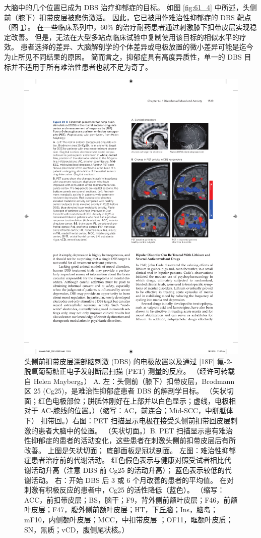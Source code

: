 大脑中的几个位置已成为 DBS 治疗抑郁症的目标。 如图 \ref{fig:61_4} 中所述，头侧前（膝下）扣带皮层被悲伤激活。 因此，它已被用作难治性抑郁症的 DBS 靶点（图 \ref{fig:61_8}）。 在一些临床系列中，60\% 的治疗耐药患者通过刺激膝下扣带皮层实现稳定改善。 但是，无法在大型多站点临床试验中复制使用该目标的相似水平的疗效。 患者选择的差异、大脑解剖学的个体差异或电极放置的微小差异可能是迄今为止所见不同结果的原因。 简而言之，抑郁症具有高度异质性，单一的 DBS 目标并不适用于所有难治性患者也就不足为奇了。

\begin{figure}[htbp]
	\centering
	\includegraphics[width=0.6\linewidth]{chap61/fig_61_8}
	\caption{头侧前扣带皮层深部脑刺激 (DBS) 的电极放置以及通过 [18F] 氟-2-脱氧葡萄糖正电子发射断层扫描 (PET) 测量的反应。 （经许可转载自 Helen Mayberg。） A. 左：头侧前（膝下）扣带皮层，Brodmann 区 25 (Cg25)，是难治性抑郁症患者 DBS 的解剖学目标。 （矢状切面；红色电极部位；胼胝体刚好在上部并以白色显示；虚线，电极相对于 AC-膝线的位置。）（缩写：AC，前连合；Mid-SCC，中胼胝体下） 扣带回。）右图：PET 扫描显示电极在接受头侧前扣带回皮层刺激的患者大脑中的位置。 （矢状切面。）B. PET 扫描显示患有难治性抑郁症的患者的活动变化，这些患者在刺激头侧前扣带皮层后有所改善。 上图是矢状切面； 底部面板是冠状剖面。 左图：难治性抑郁症患者治疗前的代谢活动。 红色假色表示与健康对照受试者相比代谢活动升高（注意 DBS 前 Cg25 的活动升高）； 蓝色表示较低的代谢活动。 右：开始 DBS 后 3 或 6 个月改善的患者的平均值。 在对刺激有积极反应的患者中，Cg25 的活性降低（蓝色）。 （缩写：ACC，前扣带皮层；BS，脑干；F9，背外侧前额叶皮层；F46，前额叶皮层；F47，腹外侧前额叶皮层；HT，下丘脑；Ins，脑岛；mF10，内侧额叶皮层；MCC，中扣带皮层 ；OF11，眶额叶皮质；SN，黑质；vCD，腹侧尾状核。）}
	\label{fig:61_8}
\end{figure}


